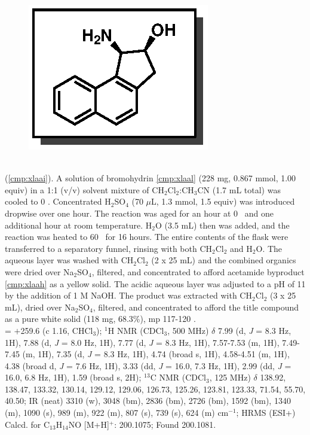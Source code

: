 \vspace{10pt}
\begin{figure}
  \vspace{-22pt}
  \begin{center}
    \includegraphics[scale=0.8]{chp_asymmetric/images/xlaai}
  \end{center}
  \vspace{-30pt}
\end{figure}
\noindent \textbf{\CMPxlaai}\\ (\ref{cmp:xlaai}). A solution of bromohydrin
\ref{cmp:xlaal} (228 mg, 0.867 mmol, 1.00 equiv) in a 1:1 (v/v) solvent mixture
of CH$_2$Cl$_2$:CH$_3$CN (1.7 mL total) was cooled to 0 \degc.
Concentrated H$_2$SO$_4$ (70 $\mu$L, 1.3 mmol, 1.5 equiv) was introduced
dropwise over one hour. The reaction was aged for an hour at 0 \degc\  and
one additional hour at room temperature. H$_2$O (3.5 mL) then was added, and the
reaction was heated to 60 \degc\  for 16 hours. The entire contents of the
flask were transferred to a separatory funnel, rinsing with both
CH$_2$Cl$_2$ and H$_2$O. The aqueous layer was washed with CH$_2$Cl$_2$ (2 x
25 mL) and the combined organics were dried over Na$_2$SO$_4$, filtered, and
concentrated to afford acetamide byproduct \ref{cmp:xlaah} as a
yellow solid. The acidic aqueous layer was adjusted to a pH of 11 by the
addition of 1 M NaOH. The product was extracted with CH$_2$Cl$_2$ (3 x 25 mL), dried over
Na$_2$SO$_4$, filtered, and concentrated to afford the title compound as a
pure white solid (118 mg, 68.3\%), mp 117-120 \degc. \\
\rotation = $+$259.6 (c 1.16, CHCl$_3$); $^1$H NMR (CDCl$_3$, 500 MHz) $\delta$
7.99 (d, \textit{J} = 8.3 Hz, 1H), 7.88 (d, \textit{J} = 8.0 Hz, 1H), 7.77 (d,
\textit{J} = 8.3 Hz, 1H), 7.57-7.53 (m, 1H), 7.49-7.45 (m, 1H), 7.35 (d,
\textit{J} = 8.3 Hz, 1H), 4.74 (broad s, 1H), 4.58-4.51 (m, 1H), 4.38 (broad d,
\textit{J} = 7.6 Hz, 1H), 3.33 (dd, \textit{J} = 16.0, 7.3 Hz, 1H), 2.99 (dd,
\textit{J} = 16.0, 6.8 Hz, 1H), 1.59 (broad s, 2H); $^{13}$C NMR (CDCl$_3$, 125
MHz) $\delta$ 138.92, 138.47, 133.32, 130.14, 129.12, 129.06, 126.73, 125.26,
123.81, 123.33, 71.54, 55.70, 40.50; IR (neat) 3310 (w), 3048 (bm), 2836 (bm),
2726 (bm), 1592 (bm), 1340 (m), 1090 (s), 989 (m), 922 (m), 807 (s), 739 (s),
624 (m) cm$^{-1}$; HRMS (ESI+) Calcd. for C$_{13}$H$_{14}$NO [M+H]$^+$:
200.1075; Found 200.1081.

